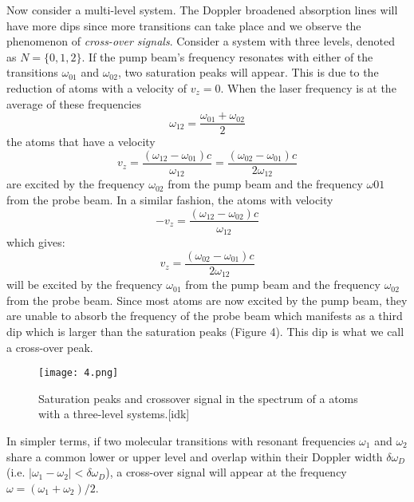 \documentclass{article}
\begin{document}
Now consider a multi-level system. The Doppler broadened absorption lines will have more dips since more transitions can take place and we observe the phenomenon of \textit{cross-over signals}.
Consider a system with three levels, denoted as $N=\{0, 1, 2\}$. If the pump beam’s frequency resonates with either of the transitions $\omega_{01}$ and $\omega_{02}$, two saturation peaks will appear. This is due to the reduction of atoms with a velocity of $v_z = 0$. When the laser frequency is at the average of these frequencies 
\begin{equation}
    \omega_{12} = \frac{\omega_{01}+\omega_{02}}{2}
\end{equation}
the atoms that have a velocity 
\begin{equation}
    v_z = \frac{(\omega_{12}-\omega_{01})c}{\omega_{12}} = \frac{(\omega_{02}-\omega_{01})c}{2\omega_{12}} 
\end{equation}
are excited by the frequency $\omega_{02}$ from the pump beam and the frequency $\omega{01}$ from the probe beam. In a similar fashion, the atoms with velocity 
\begin{equation}
   - v_z = \frac{(\omega_{12}-\omega_{02})c}{\omega_{12}} 
\end{equation}
which gives: 
\begin{equation}
    v_z = \frac{(\omega_{02}-\omega_{01})c}{2\omega_{12}}
\end{equation}
will be excited by the frequency $\omega_{01}$ from the pump beam and the frequency $\omega_{02}$ from the probe beam. Since most atoms are now excited by the pump beam, they are unable to absorb the frequency of the probe beam which manifests as a third dip which is larger than the saturation peaks (Figure 4). This dip is what we call a cross-over peak.

\begin{figure}[H]
    \centering
    \texttt{[image: 4.png]}
    \caption{Saturation peaks and crossover signal in the spectrum of a atoms with a three-level systems.[idk]}
    \label{fig:enter-label}
\end{figure}

In simpler terms, if two molecular transitions with resonant frequencies $\omega_1$ and $\omega_2$ share a common lower or upper level and overlap within their Doppler width $\delta\omega_D$ (i.e. $|{\omega_1 - \omega_2}| <\delta\omega_D$), a cross-over signal will appear at the frequency $\omega = (\omega_1 + \omega_2)/2$.
\end{document}
